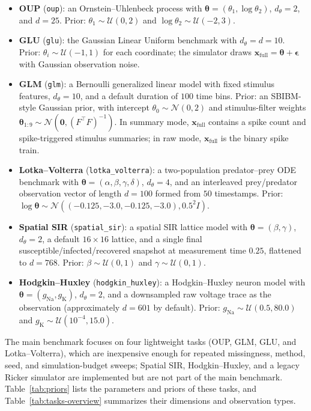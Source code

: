 \documentclass{article} %
\providecommand{\xfull}{\mathbf{x}_{\mathrm{full}}}
\providecommand{\thetab}{\boldsymbol{\theta}}
\begin{document}
\begin{itemize}
  \item \textbf{OUP} (\texttt{oup}): an Ornstein--Uhlenbeck process with
  $\thetab = (\theta_1, \log \theta_2)$, $d_\theta = 2$, and $d=25$. Prior:
  $\theta_1 \sim \mathcal{U}(0,2)$ and
  $\log \theta_2 \sim \mathcal{U}(-2,3)$.
  \item \textbf{GLU} (\texttt{glu}): the Gaussian Linear Uniform benchmark with
  $d_\theta = d = 10$. Prior:
  $\theta_i \sim \mathcal{U}(-1,1)$ for each coordinate; the simulator draws
  $\xfull = \thetab + \boldsymbol{\epsilon}$ with Gaussian observation noise.
  \item \textbf{GLM} (\texttt{glm}): a Bernoulli generalized linear model with
  fixed stimulus features, $d_\theta=10$, and a default duration of $100$ time
  bins. Prior: an SBIBM-style Gaussian prior, with intercept
  $\theta_0 \sim \mathcal{N}(0,2)$ and stimulus-filter weights
  $\thetab_{1:9} \sim \mathcal{N}(\mathbf{0},(F^\top F)^{-1})$. In summary
  mode, $\xfull$ contains a spike count and spike-triggered stimulus summaries;
  in raw mode, $\xfull$ is the binary spike train.
  \item \textbf{Lotka--Volterra} (\texttt{lotka\_volterra}): a two-population
  predator--prey ODE benchmark with
  $\thetab=(\alpha,\beta,\gamma,\delta)$, $d_\theta=4$, and an interleaved
  prey/predator observation vector of length $d=100$ formed from $50$ timestamps.
  Prior: $\log \thetab \sim
  \mathcal{N}((-0.125,-3.0,-0.125,-3.0), 0.5^2 I)$.
  \item \textbf{Spatial SIR} (\texttt{spatial\_sir}): a spatial SIR lattice model
  with $\thetab=(\beta,\gamma)$, $d_\theta=2$, a default $16 \times 16$ lattice,
  and a single final susceptible/infected/recovered snapshot at measurement time
  $0.25$, flattened to $d=768$. Prior:
  $\beta \sim \mathcal{U}(0,1)$ and $\gamma \sim \mathcal{U}(0,1)$.
  \item \textbf{Hodgkin--Huxley} (\texttt{hodgkin\_huxley}): a Hodgkin--Huxley
  neuron model with $\thetab=(g_{\mathrm{Na}}, g_{\mathrm{K}})$,
  $d_\theta=2$, and a downsampled raw voltage trace as the observation
  (approximately $d=601$ by default). Prior:
  $g_{\mathrm{Na}} \sim \mathcal{U}(0.5,80.0)$ and
  $g_{\mathrm{K}} \sim \mathcal{U}(10^{-4},15.0)$.
\end{itemize}

The main benchmark focuses on four lightweight tasks (OUP, GLM, GLU,
and Lotka--Volterra), which are inexpensive enough for repeated missingness,
method, seed, and simulation-budget sweeps; Spatial SIR, Hodgkin--Huxley, and a
legacy Ricker simulator are implemented but are not part of the main benchmark.
Table~\ref{tab:priors}
lists the parameters and priors of these tasks, and
Table~\ref{tab:tasks-overview} summarizes their dimensions and observation types.
\end{document}

